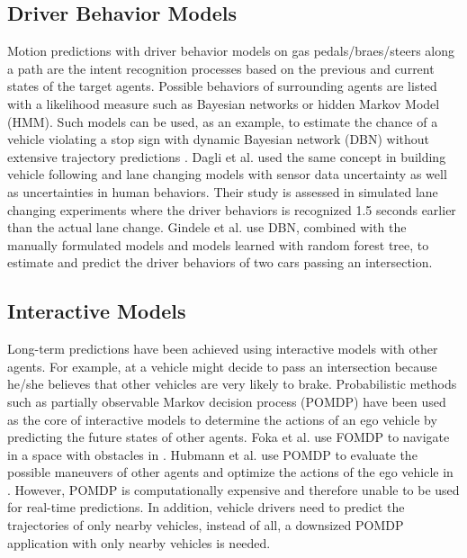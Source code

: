 \subsection{Driver Behavior Models}
\label{Literature:Driver Behavior}
Motion predictions with driver behavior models on gas pedals/braes/steers along a path are the intent recognition processes based on the previous and current states of the target agents. Possible behaviors of surrounding agents are listed with a likelihood measure such as Bayesian networks or hidden Markov Model (HMM). Such models can be used, as an example, to estimate the chance of a vehicle violating a stop sign with dynamic Bayesian network (DBN) without extensive trajectory predictions \cite{Lefevre2012}. Dagli et al. \cite{Dagli2003} used the same concept in building vehicle following and lane changing models with sensor data uncertainty as well as uncertainties in human behaviors. Their study is assessed in simulated lane changing experiments where the driver behaviors is recognized 1.5 seconds earlier than the actual lane change. Gindele et al. \cite{Gindele2013} use DBN, combined with the manually formulated models and models learned with random forest tree,  to estimate and predict the driver behaviors of two cars passing an intersection. 




\subsection{Interactive Models}
\label{Literature:Interactive}
Long-term predictions have been achieved using interactive models with other agents. For example, at a vehicle might decide to pass an intersection because he/she believes that other vehicles are very likely to brake. Probabilistic methods such as partially observable Markov decision process (POMDP) have been used as the core of interactive models to determine the actions of an ego vehicle by predicting the future states of other agents. Foka et al. use FOMDP to navigate in a space with obstacles in \cite{Foka}. Hubmann et al. use POMDP to evaluate the possible maneuvers of other agents and optimize the actions of the ego vehicle in \cite{state_uncertain_environment}. However, POMDP is computationally expensive and therefore unable to be used for  real-time predictions. In addition, vehicle drivers need to predict the trajectories of only nearby vehicles, instead of all, a downsized POMDP application with only nearby vehicles is needed.


